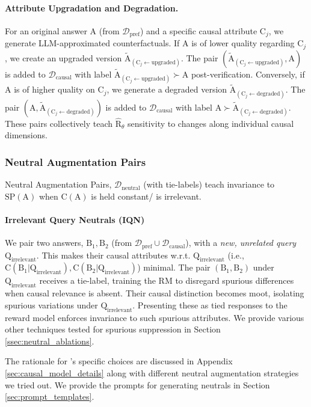 \paragraph{Attribute Upgradation and Degradation.}
For an original answer $\mathrm{A}$ (from $\mathcal{D}_{\mathrm{pref}}$) and a specific causal attribute $\mathrm{C}_j$, we generate LLM-approximated counterfactuals.
If $\mathrm{A}$ is of lower quality regarding $\mathrm{C}_j$, we create an upgraded version $\tilde{\mathrm{A}}_{(\mathrm{C}_j \leftarrow \text{upgraded})}$. The pair $(\tilde{\mathrm{A}}_{(\mathrm{C}_j \leftarrow \text{upgraded})}, \mathrm{A})$ is added to $\mathcal{D}_{\mathrm{causal}}$ with label $\tilde{\mathrm{A}}_{(\mathrm{C}_j \leftarrow \text{upgraded})} \succ \mathrm{A}$ post-verification.
Conversely, if $\mathrm{A}$ is of higher quality on $\mathrm{C}_j$, we generate a degraded version $\tilde{\mathrm{A}}_{(\mathrm{C}_j \leftarrow \text{degraded})}$. The pair $(\mathrm{A}, \tilde{\mathrm{A}}_{(\mathrm{C}_j \leftarrow \text{degraded})})$ is added to $\mathcal{D}_{\mathrm{causal}}$ with label $\mathrm{A} \succ \tilde{\mathrm{A}}_{(\mathrm{C}_j \leftarrow \text{degraded})}$.
These pairs collectively teach $\hat{\mathrm{R}}_\theta$ sensitivity to changes along individual causal dimensions.


\subsubsection{Neutral Augmentation Pairs}

Neutral Augmentation Pairs, $\mathcal{D}_{\mathrm{neutral}}$ (with tie-labels) teach invariance to $\mathrm{SP}(\mathrm{A})$ when $\mathrm{C}(\mathrm{A})$ is held constant/ is irrelevant.
\vspace{-0.1in}
\paragraph{Irrelevant Query Neutrals (IQN)} We pair two answers, $\mathrm{B}_1, \mathrm{B}_2$ (from $\mathcal{D}_{\mathrm{pref}} \cup \mathcal{D}_{\mathrm{causal}}$), with a \textit{new, unrelated query} $\mathrm{Q}_{\text{irrelevant}}$. This makes their causal attributes w.r.t. $\mathrm{Q}_{\text{irrelevant}}$ (i.e., $\mathrm{C(B_1|Q_{\text{irrelevant}})}, \mathrm{C(B_2|Q_{\text{irrelevant}})}$) minimal. The pair $(\mathrm{B}_1, \mathrm{B}_2)$ under $\mathrm{Q}_{\text{irrelevant}}$ receives a tie-label, training the RM to disregard spurious differences when causal relevance is absent. Their causal distinction becomes moot, isolating spurious variations under $\mathrm{Q}_{\text{irrelevant}}$. Presenting these as tied responses to the reward model enforces invariance to such spurious attributes.
We provide various other techniques tested for spurious suppression in Section \ref{ssec:neutral_ablations}.


The rationale for \carma{}'s specific choices are discussed in Appendix \ref{sec:causal_model_details} along with different neutral augmentation strategies we tried out. We provide the prompts for generating neutrals in Section \ref{sec:prompt_templates}.